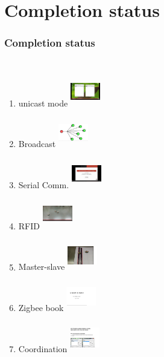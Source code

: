 \documentclass[table,10pt,blue]{beamer}	%
\begin{document}
\section{Completion status} %
\begin{frame}
\frametitle{Completion status}
\begin{columns}[c] %

\begin{enumerate} \color{red}
\item unicast mode \includegraphics[width=1.3cm,height=1.3cm,keepaspectratio]{unicast}
\item Broadcast \includegraphics[width=1.3cm,height=1.3cm,keepaspectratio]{broad}
\item Serial Comm. \includegraphics[width=1.3cm,height=1.3cm,keepaspectratio]{serial}
\item RFID  \includegraphics[width=1.3cm,height=1.3cm,keepaspectratio]{RFID}
\item Master-slave      \includegraphics[width=1.3cm,height=1.3cm,keepaspectratio]{masl}
\item Zigbee book \includegraphics[width=1.3cm,height=1.3cm,keepaspectratio]{guide}
\item Coordination \includegraphics[width=1.3cm,height=1.3cm,keepaspectratio]{coordination} \color{black}
\end{enumerate}


\end{columns}
\end{frame}
\end{document}
